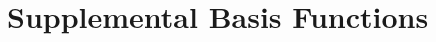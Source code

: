 \section{Supplemental Basis Functions}
%
%
\inputminted{md}{parts/basis7s7p.txt}
\inputminted{md}{parts/basis3s1p.txt}
\newpage
